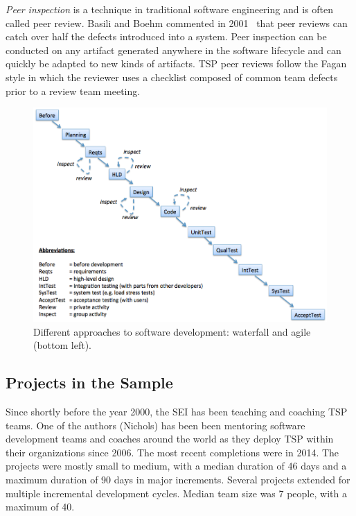   
 
{\em Peer inspection} is a  technique in
traditional software engineering and is often called peer review.
 Basili and Boehm   commented in 2001~\cite{boehm01} 
that peer reviews can catch over half the defects introduced into a system.
Peer inspection can be conducted on any artifact generated anywhere in the software
lifecycle and can quickly be adapted to new kinds of artifacts. TSP peer reviews follow the Fagan style in which the reviewer uses a checklist composed of common team defects prior to a review team meeting. 


\begin{figure}[!t]
\begin{center}
\includegraphics[width=6in]{img/waterfall-v2.png}
\end{center}
\caption{Different approaches to software development:  waterfall and agile (bottom left).}
\label{fig:waterfall}
\end{figure}


\subsection{Projects in the Sample}
Since shortly before the year 2000, the SEI has been teaching and coaching TSP teams. One of the authors (Nichols) has been been mentoring software development teams and coaches around the world as they deploy TSP within their organizations since 2006.  The  most recent completions were in 2014.
The projects were mostly small to medium, with a median duration of 46 days and a maximum duration of 90 days in major increments. 
Several projects extended for multiple incremental development cycles. 
Median team size was 7 people, with a maximum of 40. 

